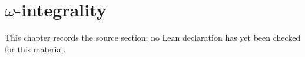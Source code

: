 \chapter{$\omega$-integrality}
\label{chabauty-coleman-bound-surfaces-chapter-04}

\begin{remark}
\label{chabauty-coleman-bound-surfaces-chapter-04-source}
This chapter records the source section; no Lean declaration has yet been checked for this material.
\notready
\end{remark}

\label{Secwint}



